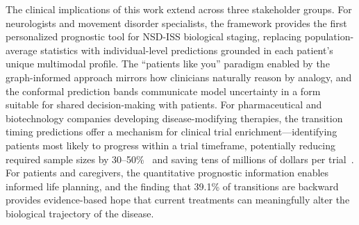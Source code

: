 The clinical implications of this work extend across three stakeholder groups. For neurologists and movement disorder specialists, the framework provides the first personalized prognostic tool for NSD-ISS biological staging, replacing population-average statistics with individual-level predictions grounded in each patient's unique multimodal profile. The ``patients like you'' paradigm enabled by the graph-informed approach mirrors how clinicians naturally reason by analogy, and the conformal prediction bands communicate model uncertainty in a form suitable for shared decision-making with patients. For pharmaceutical and biotechnology companies developing disease-modifying therapies, the transition timing predictions offer a mechanism for clinical trial enrichment---identifying patients most likely to progress within a trial timeframe, potentially reducing required sample sizes by 30--50\%~\cite{temple2010} and saving tens of millions of dollars per trial~\cite{wouters2020}. For patients and caregivers, the quantitative prognostic information enables informed life planning, and the finding that 39.1\% of transitions are backward provides evidence-based hope that current treatments can meaningfully alter the biological trajectory of the disease.

